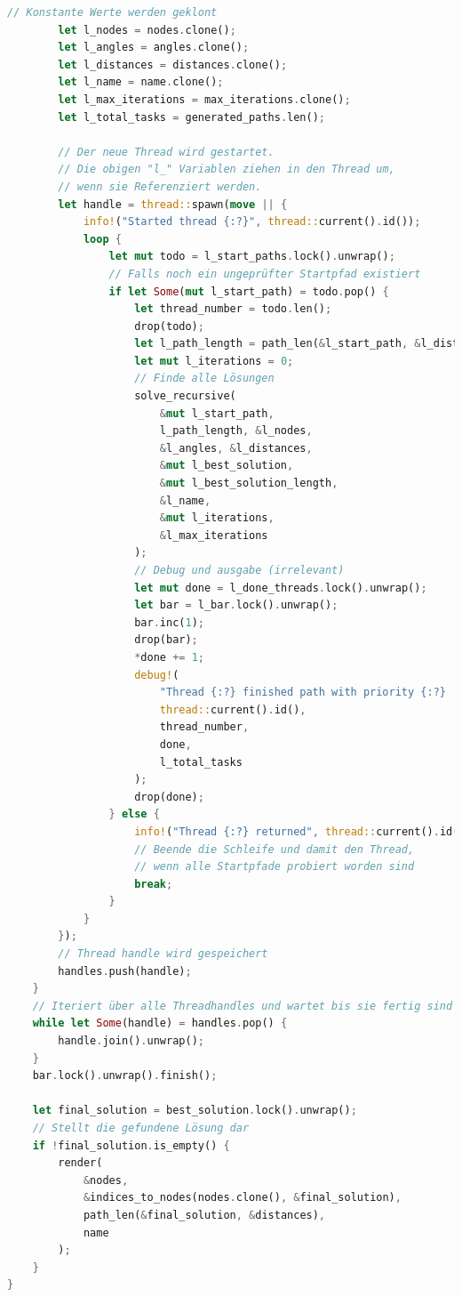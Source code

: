 \documentclass[a4paper,10pt,ngerman]{scrartcl}
\begin{document}
\begin{lstlisting}[language=Rust]
        // Konstante Werte werden geklont
        let l_nodes = nodes.clone();
        let l_angles = angles.clone();
        let l_distances = distances.clone();
        let l_name = name.clone();
        let l_max_iterations = max_iterations.clone();
        let l_total_tasks = generated_paths.len();

        // Der neue Thread wird gestartet.
        // Die obigen "l_" Variablen ziehen in den Thread um, 
        // wenn sie Referenziert werden.
        let handle = thread::spawn(move || {
            info!("Started thread {:?}", thread::current().id());
            loop {
                let mut todo = l_start_paths.lock().unwrap();
                // Falls noch ein ungeprüfter Startpfad existiert
                if let Some(mut l_start_path) = todo.pop() {
                    let thread_number = todo.len();
                    drop(todo);
                    let l_path_length = path_len(&l_start_path, &l_distances);
                    let mut l_iterations = 0;
                    // Finde alle Lösungen
                    solve_recursive(
                        &mut l_start_path, 
                        l_path_length, &l_nodes, 
                        &l_angles, &l_distances, 
                        &mut l_best_solution, 
                        &mut l_best_solution_length, 
                        &l_name, 
                        &mut l_iterations, 
                        &l_max_iterations
                    );
                    // Debug und ausgabe (irrelevant)
                    let mut done = l_done_threads.lock().unwrap();
                    let bar = l_bar.lock().unwrap();
                    bar.inc(1);
                    drop(bar);
                    *done += 1;
                    debug!(
                        "Thread {:?} finished path with priority {:?}  {:?}/{:?}",
                        thread::current().id(), 
                        thread_number, 
                        done, 
                        l_total_tasks
                    );
                    drop(done);
                } else {
                    info!("Thread {:?} returned", thread::current().id());
                    // Beende die Schleife und damit den Thread,
                    // wenn alle Startpfade probiert worden sind
                    break;
                }
            }
        });
        // Thread handle wird gespeichert
        handles.push(handle);
    }
    // Iteriert über alle Threadhandles und wartet bis sie fertig sind
    while let Some(handle) = handles.pop() {
        handle.join().unwrap();
    }
    bar.lock().unwrap().finish();

    let final_solution = best_solution.lock().unwrap();
    // Stellt die gefundene Lösung dar
    if !final_solution.is_empty() {
        render(
            &nodes, 
            &indices_to_nodes(nodes.clone(), &final_solution), 
            path_len(&final_solution, &distances), 
            name
        );
    }
}
\end{lstlisting}
\end{document}
